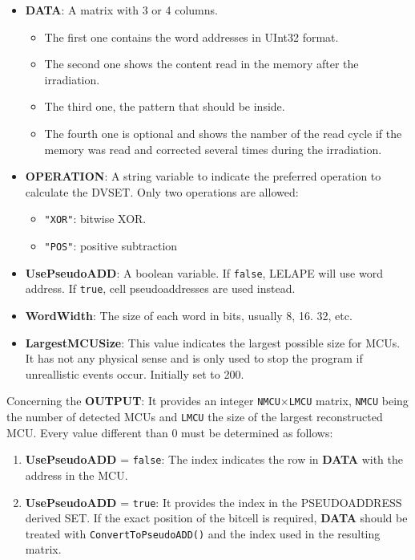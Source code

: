 \begin{itemize}
	 \begin{itemize}
	 	\item \textbf{DATA}: A matrix with 3 or 4 columns. 
	 		\begin{itemize}
	 			\item  The first one contains the word addresses in UInt32 format.
	 			\item        The second one shows the content read in the memory after the irradiation.
	 			\item        The third one, the pattern that should be inside.
	 			\item        The fourth one is optional and shows the namber of the read cycle if the  memory was read and corrected several times during the irradiation.
	 		\end{itemize}
	 	\item \textbf{OPERATION}: A string variable to indicate the preferred operation to calculate
	 	the DVSET. Only two operations are allowed: 
 		\begin{itemize}
			\item \texttt{"XOR"}: bitwise XOR.
			\item\texttt{"POS"}: positive subtraction
		\end{itemize}
	 	\item \textbf{UsePseudoADD}: A boolean variable. If \texttt{false}, LELAPE will use word address. If \texttt{true}, cell pseudoaddresses are used instead.
	 	\item \textbf{WordWidth}: The size of each word in bits, usually 8, 16. 32, etc.
	 	\item \textbf{LargestMCUSize}: This value indicates the largest possible size for MCUs. It has not any physical sense
	 	and is only used to stop the program if unreallistic events occur. Initially set to 200.
	 \end{itemize}
  
	 Concerning the \textbf{OUTPUT}: It provides an integer \texttt{NMCU}\(\times\)\texttt{LMCU} matrix, \texttt{NMCU} being the number of detected MCUs and
	 \texttt{LMCU} the size of the largest reconstructed MCU. Every value different than 0 must be determined as follows:
	 \begin{enumerate}
	 	\item \textbf{UsePseudoADD} = \texttt{false}: The index indicates the row in \textbf{DATA} with the address in the MCU.
	 	\item \textbf{UsePseudoADD} = \texttt{true}: It provides the index in the PSEUDOADDRESS derived SET. If the exact position of
	 	the bitcell is required, \textbf{DATA} should be treated with \texttt{ConvertToPseudoADD()} and
	 	the index used in the resulting matrix.
	 \end{enumerate}
 

\end{itemize}
